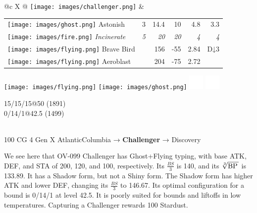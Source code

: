 \begin{speciesbox}[title=OV-099 Challenger,title style={left color=Flying,right color=Ghost},after title={\hfill 200 120 100 140.00 133.89}]
\footnotesize
\begin{tabularx}{\linewidth}{@{}c X @{}}
\texttt{[image: images/challenger.png]} &
\begingroup
\setlength{\tabcolsep}{4pt}
\begin{tabular}{lrrrrr}
\texttt{[image: images/ghost.png]} Astonish & 3 & 14.4 & 10 & 4.8 & 3.3 \\
\texttt{[image: images/fire.png]} \textit{Incinerate} & \textit{5} & \textit{20} & \textit{20} & \textit{4} & \textit{4} \\
\texttt{[image: images/flying.png]} Brave Bird & & 156 & -55 & 2.84 & D↓3 \\
\texttt{[image: images/flying.png]} Aeroblast & & 204 & -75 & 2.72 & \\
\end{tabular}
\endgroup
\end{tabularx}
\noindent\begin{minipage}{0.3\linewidth}
\texttt{[image: images/flying.png]}
\texttt{[image: images/ghost.png]}
\includegraphics[height=2em,keepaspectratio]{images/windy.png}
\includegraphics[height=2em,keepaspectratio]{images/fog.png}
\end{minipage}
\begin{minipage}{0.7\linewidth}\raggedleft{}
\vfill{}
  15/15/15@50 (1891)\\
  0/14/1@42.5 (1499)
\end{minipage}\\
\scriptsize{}100 CG 4 Gen X Atlantic\hfill{}Columbia → \textbf{Challenger} → Discovery
\end{speciesbox}
\bigskip\noindent{}We see here that OV-099 Challenger has Ghost+Flying typing, with base ATK, DEF, and STA
of 200, 120, and 100, respectively. Its $\frac{BS}{3}$ is 140, and its $\sqrt[3]{\mbox{BP}\,}$ is 133.89.
It has a Shadow form, but not a Shiny form. The Shadow form has higher ATK and lower DEF, changing
its $\frac{BS}{3}$ to 146.67. Its optimal configuration for a  bound is 0/14/1 at level 42.5.
It is poorly suited for  bounds and liftoffs in low temperatures.
Capturing a Challenger rewards 100 Stardust.
\clearpage

